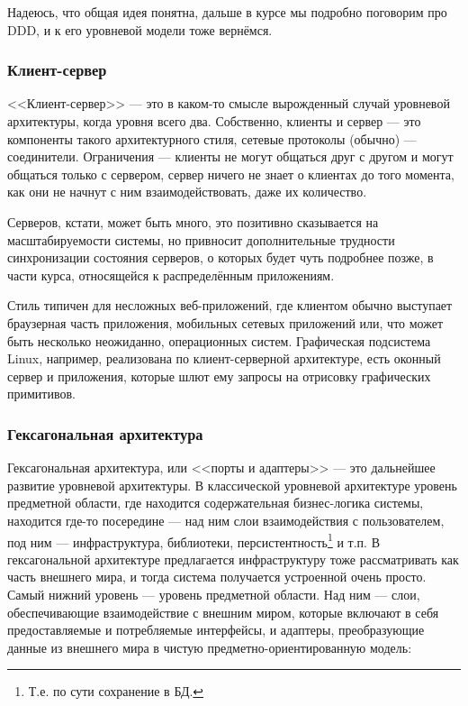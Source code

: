 \documentclass{../../text-style}
\begin{document}
Надеюсь, что общая идея понятна, дальше в курсе мы подробно поговорим про DDD, и к его уровневой модели тоже вернёмся.

\subsubsection{Клиент-сервер}

<<Клиент-сервер>> --- это в каком-то смысле вырожденный случай уровневой архитектуры, когда уровня всего два. Собственно, клиенты и сервер --- это компоненты такого архитектурного стиля, сетевые протоколы (обычно) --- соединители. Ограничения --- клиенты не могут общаться друг с другом и могут общаться только с сервером, сервер ничего не знает о клиентах до того момента, как они не начнут с ним взаимодействовать, даже их количество. 

Серверов, кстати, может быть много, это позитивно сказывается на масштабируемости системы, но привносит дополнительные трудности синхронизации состояния серверов, о которых будет чуть подробнее позже, в части курса, относящейся к распределённым приложениям.

Стиль типичен для несложных веб-приложений, где клиентом обычно выступает браузерная часть приложения, мобильных сетевых приложений или, что может быть несколько неожиданно, операционных систем. Графическая подсистема Linux, например, реализована по клиент-серверной архитектуре, есть оконный сервер и приложения, которые шлют ему запросы на отрисовку графических примитивов.

\subsubsection{Гексагональная архитектура}

Гексагональная архитектура, или <<порты и адаптеры>> --- это дальнейшее развитие уровневой архитектуры. В классической уровневой архитектуре уровень предметной области, где находится содержательная бизнес-логика системы, находится где-то посередине --- над ним слои взаимодействия с пользователем, под ним --- инфраструктура, библиотеки, персистентность\footnote{Т.е. по сути сохранение в БД.} и т.п. В гексагональной архитектуре предлагается инфраструктуру тоже рассматривать как часть внешнего мира, и тогда система получается устроенной очень просто. Самый нижний уровень --- уровень предметной области. Над ним --- слои, обеспечивающие взаимодействие с внешним миром, которые включают в себя предоставляемые и потребляемые интерфейсы, и адаптеры, преобразующие данные из внешнего мира в чистую предметно-ориентированную модель:
\end{document}
